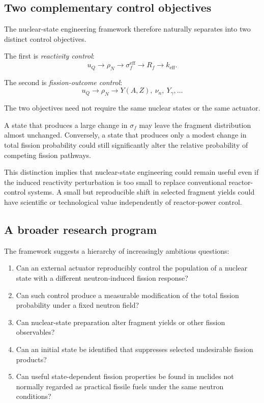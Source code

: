 \subsection{Two complementary control objectives}

The nuclear-state engineering framework therefore naturally separates into two distinct control objectives.

The first is \emph{reactivity control}:
\begin{equation}
u_Q
\rightarrow
\rho_N
\rightarrow
\sigma_f^{\mathrm{eff}}
\rightarrow
R_f
\rightarrow
k_{\mathrm{eff}}.
\label{eq:reactivity_objective}
\end{equation}

The second is \emph{fission-outcome control}:
\begin{equation}
u_Q
\rightarrow
\rho_N
\rightarrow
Y(A,Z),
\ \nu_n,
\ Y_\gamma,
\ldots
\label{eq:outcome_objective}
\end{equation}

The two objectives need not require the same nuclear states or the same actuator.

A state that produces a large change in $\sigma_f$ may leave the fragment distribution almost unchanged. Conversely, a state that produces only a modest change in total fission probability could still significantly alter the relative probability of competing fission pathways.

This distinction implies that nuclear-state engineering could remain useful even if the induced reactivity perturbation is too small to replace conventional reactor-control systems. A small but reproducible shift in selected fragment yields could have scientific or technological value independently of reactor-power control.

\subsection{A broader research program}

The framework suggests a hierarchy of increasingly ambitious questions:

\begin{enumerate}
\item Can an external actuator reproducibly control the population of a nuclear state with a different neutron-induced fission response?
\item Can such control produce a measurable modification of the total fission probability under a fixed neutron field?
\item Can nuclear-state preparation alter fragment yields or other fission observables?
\item Can an initial state be identified that suppresses selected undesirable fission products?
\item Can useful state-dependent fission properties be found in nuclides not normally regarded as practical fissile fuels under the same neutron conditions?
\end{enumerate}

